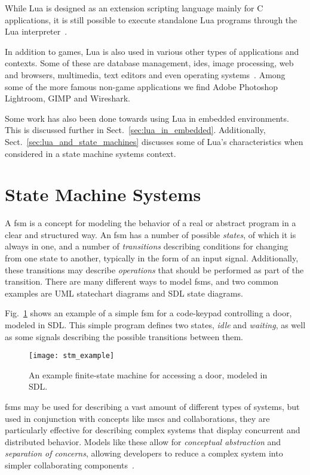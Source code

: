 While Lua is designed as an extension scripting language mainly for C applications, it is still possible to execute standalone Lua programs through the Lua interpreter~\cite[ch. 7]{manual:lua_reference_manual}.

In addition to games, Lua is also used in various other types of applications and contexts. Some of these are database management, \glspl{ide}, image processing, web and browsers, multimedia, text editors and even operating systems~\cite{website:where_lua_is_used}. Among some of the more famous non-game applications we find Adobe Photoshop Lightroom, GIMP and Wireshark.

Some work has also been done towards using Lua in embedded environments. This is discussed further in Sect.~\ref{sec:lua_in_embedded}. Additionally, Sect.~\ref{sec:lua_and_state_machines} discusses some of Lua's characteristics when considered in a state machine systems context.

\section{State Machine Systems}
\label{sec:state_machine_system}
A \gls{fsm} is a concept for modeling the behavior of a real or abstract program in a clear and structured way. An \gls{fsm} has a number of possible \emph{states}, of which it is always in one, and a number of \emph{transitions} describing conditions for changing from one state to another, typically in the form of an input signal. Additionally, these transitions may describe \emph{operations} that should be performed as part of the transition. There are many different ways to model \glspl{fsm}, and two common examples are UML statechart diagrams and SDL state diagrams.

Fig.~\ref{fig:fsm_example} shows an example of a simple \gls{fsm} for a code-keypad controlling a door, modeled in SDL. This simple program defines two states, \emph{idle} and \emph{waiting}, as well as some signals describing the possible transitions between them.

\begin{figure}[htp]
	\centering
	\texttt{[image: stm\_example]}
	\caption[SDL finite-state machine example]{An example finite-state machine for accessing a door, modeled in SDL.}
	\label{fig:fsm_example}
\end{figure}

\glspl{fsm} may be used for describing a vast amount of different types of systems, but used in conjunction with concepts like \glspl{msc} and collaborations, they are particularly effective for describing complex systems that display concurrent and distributed behavior. Models like these allow for \emph{conceptual abstraction} and \emph{separation of concerns}, allowing developers to reduce a complex system into simpler collaborating components~\cite{article:itut_methodologies}.

